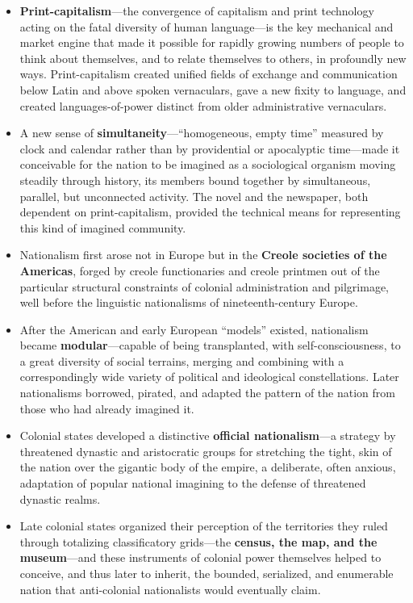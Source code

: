 \documentclass[12pt]{article}
\begin{document}
\begin{itemize}[leftmargin=*, itemsep=4pt]
    \item \textbf{Print-capitalism}---the convergence of capitalism and print technology acting on the fatal diversity of human language---is the key mechanical and market engine that made it possible for rapidly growing numbers of people to think about themselves, and to relate themselves to others, in profoundly new ways. Print-capitalism created unified fields of exchange and communication below Latin and above spoken vernaculars, gave a new fixity to language, and created languages-of-power distinct from older administrative vernaculars.
    \item A new sense of \textbf{simultaneity}---``homogeneous, empty time'' measured by clock and calendar rather than by providential or apocalyptic time---made it conceivable for the nation to be imagined as a sociological organism moving steadily through history, its members bound together by simultaneous, parallel, but unconnected activity. The novel and the newspaper, both dependent on print-capitalism, provided the technical means for representing this kind of imagined community.
    \item Nationalism first arose not in Europe but in the \textbf{Creole societies of the Americas}, forged by creole functionaries and creole printmen out of the particular structural constraints of colonial administration and pilgrimage, well before the linguistic nationalisms of nineteenth-century Europe.
    \item After the American and early European ``models'' existed, nationalism became \textbf{modular}---capable of being transplanted, with self-consciousness, to a great diversity of social terrains, merging and combining with a correspondingly wide variety of political and ideological constellations. Later nationalisms borrowed, pirated, and adapted the pattern of the nation from those who had already imagined it.
    \item Colonial states developed a distinctive \textbf{official nationalism}---a strategy by threatened dynastic and aristocratic groups for stretching the tight, skin of the nation over the gigantic body of the empire, a deliberate, often anxious, adaptation of popular national imagining to the defense of threatened dynastic realms.
    \item Late colonial states organized their perception of the territories they ruled through totalizing classificatory grids---the \textbf{census, the map, and the museum}---and these instruments of colonial power themselves helped to conceive, and thus later to inherit, the bounded, serialized, and enumerable nation that anti-colonial nationalists would eventually claim.
\end{itemize}
\end{document}
